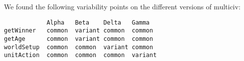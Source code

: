 We found the following variability points on the different versions of multiciv:

\begin{verbatim}
            Alpha   Beta    Delta   Gamma
getWinner   common  variant common  common
getAge      common  variant common  common
worldSetup  common  common  variant common
unitAction  common  common  common  variant
\end{verbatim}
